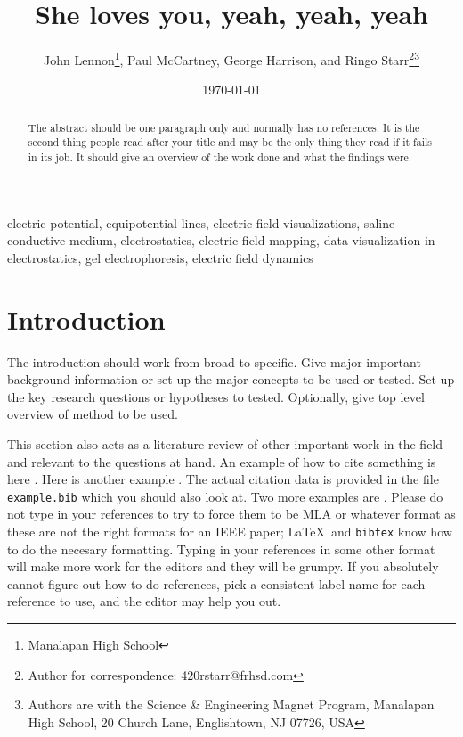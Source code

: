 \documentclass[10pt,draftcls,journal,onecolumn]{IEEEtran}
\title{She loves you, yeah, yeah, yeah} %
\author{John Lennon\thanks{Manalapan High School}, Paul McCartney, George Harrison, and Ringo Starr\thanks{Author for correspondence: 420rstarr@frhsd.com}\thanks{Authors are with the Science \& Engineering Magnet Program, Manalapan High School, 20 Church Lane, Englishtown, NJ 07726, USA}} %
\date{\today}
\newcommand{\keywords}{electric potential, equipotential lines, electric field visualizations, saline conductive medium, electrostatics, electric field mapping, data visualization in electrostatics, gel electrophoresis, electric field dynamics} %
\begin{document}
\linenumbers %
\maketitle

\begin{abstract}
The abstract should be one paragraph only and normally has no references. It is the second thing people read after your title and may be the only thing they read if it fails in its job. It should give an overview of the work done and what the findings were. 
\end{abstract}

\begin{IEEEkeywords}
\keywords
\end{IEEEkeywords}

\section{Introduction}
The introduction should work from broad to specific. Give major important background information or set up the major concepts to be used or tested. Set up the key research questions or hypotheses to tested. Optionally, give top level overview of method to be used. 

This section also acts as a literature review of other important work in the field and relevant to the questions at hand. An example of how to cite something is here \cite{tipler}. Here is another example \cite{openstax}. The actual citation data is provided in the file \texttt{example.bib} which you should also look at. Two more examples are \cite{rombauer:1931:joy, binzel:1988:hemispherical}. Please do not type in your references to try to force them to be MLA or whatever format as these are not the right formats for an IEEE paper; \LaTeX\ and \texttt{bibtex} know how to do the necesary formatting. Typing in your references in some other format will make more work for the editors and they will be grumpy. If you absolutely cannot figure out how to do references, pick a consistent label name for each reference to use, and the editor may help you out. 
\end{document}
